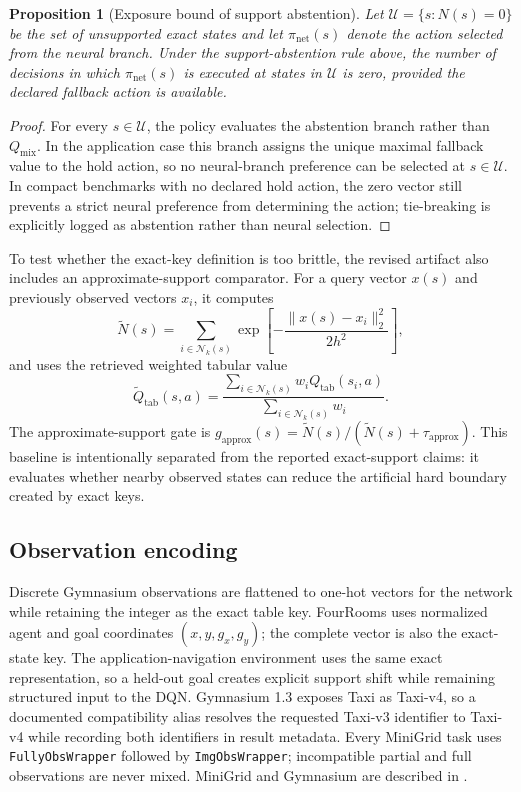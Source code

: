 \documentclass[preprint,12pt]{elsarticle}
\newtheorem{proposition}{Proposition}
\begin{document}
\begin{proposition}[Exposure bound of support abstention]
Let $\mathcal{U}=\{s:N(s)=0\}$ be the set of unsupported exact states and
let $\pi_{\mathrm{net}}(s)$ denote the action selected from the neural branch.
Under the support-abstention rule above, the number of decisions in which
$\pi_{\mathrm{net}}(s)$ is executed at states in $\mathcal{U}$ is zero,
provided the declared fallback action is available.
\end{proposition}
\begin{proof}
For every $s\in\mathcal{U}$, the policy evaluates the abstention branch rather
than $Q_{\mathrm{mix}}$. In the application case this branch assigns the unique
maximal fallback value to the hold action, so no neural-branch preference can
be selected at $s\in\mathcal{U}$. In compact benchmarks with no declared
hold action, the zero vector still prevents a strict neural preference from
determining the action; tie-breaking is explicitly logged as abstention rather
than neural selection.
\end{proof}

To test whether the exact-key definition is too brittle, the revised artifact
also includes an approximate-support comparator. For a query vector $x(s)$ and
previously observed vectors $x_i$, it computes
\begin{equation}
\widetilde{N}(s)=\sum_{i\in\mathcal{N}_k(s)}
\exp\left[-\frac{\|x(s)-x_i\|_2^2}{2h^2}\right],
\end{equation}
and uses the retrieved weighted tabular value
\begin{equation}
\widetilde{Q}_{\mathrm{tab}}(s,a)=
\frac{\sum_{i\in\mathcal{N}_k(s)} w_i Q_{\mathrm{tab}}(s_i,a)}
{\sum_{i\in\mathcal{N}_k(s)} w_i}.
\end{equation}
The approximate-support gate is
$g_{\mathrm{approx}}(s)=\widetilde{N}(s)/(\widetilde{N}(s)+\tau_{\mathrm{approx}})$.
This baseline is intentionally separated from the reported exact-support
claims: it evaluates whether nearby observed states can reduce the artificial
hard boundary created by exact keys.

\subsection{Observation encoding}

Discrete Gymnasium observations are flattened to one-hot vectors for the
network while retaining the integer as the exact table key. FourRooms uses
normalized agent and goal coordinates $(x,y,g_x,g_y)$; the complete vector is
also the exact-state key. The application-navigation environment uses the same
exact representation, so a held-out goal creates explicit support shift while
remaining structured input to the DQN. Gymnasium 1.3 exposes Taxi as Taxi-v4,
so a documented
compatibility alias resolves the requested Taxi-v3 identifier to Taxi-v4 while
recording both identifiers in result metadata. Every MiniGrid task uses
\texttt{FullyObsWrapper} followed by \texttt{ImgObsWrapper}; incompatible
partial and full observations are never mixed. MiniGrid and Gymnasium are
described in \cite{chevalierboisvert2023minigrid,towers2024gymnasium}.
\end{document}
